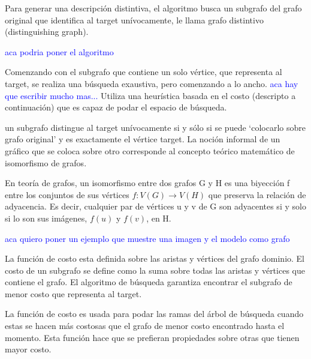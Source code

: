 
Para generar una descripci\'on distintiva, el algoritmo busca un subgrafo del grafo original que identifica al target un\'{i}vocamente, le llama grafo distintivo (distinguishing graph).

\textcolor{blue}{aca podria poner el algoritmo}

Comenzando con el subgrafo que contiene un solo v\'ertice, que representa al target, se realiza una b\'usqueda exaustiva, pero comenzando a lo ancho. \textcolor{blue}{aca hay que escribir mucho mas...} Utiliza una heur\'{i}stica basada en el costo (descripto a continuaci\'on) que es capaz de podar el espacio de b\'usqueda.


un subgrafo distingue al target un\'ivocamente si y s\'olo si se puede `colocarlo sobre grafo original' y es exactamente el
v\'ertice target. La noci\'on informal de un gr\'afico que se coloca sobre otro corresponde al concepto te\'orico matem\'atico de isomorfismo de grafos.

En teor\'{i}a de grafos, un isomorfismo entre dos grafos G y H es una biyecci\'on f entre los conjuntos de sus v\'ertices $f:V(G) \rightarrow V(H)$ que preserva la relaci\'on de adyacencia. Es decir, cualquier par de v\'ertices u y v de G son adyacentes si y solo si lo son sus im\'agenes, $f(u)$ y $f(v)$, en H.




\textcolor{blue}{aca quiero poner un ejemplo que muestre una imagen y el modelo como grafo}

La funci\'on de costo esta definida sobre las aristas y v\'ertices del grafo dominio. El costo de un subgrafo se define como la suma sobre todas las aristas y v\'ertices que contiene el grafo.
El algoritmo de b\'usqueda garantiza encontrar el subgrafo de menor costo que representa al target.

La funci\'on de costo es usada para podar las ramas del \'arbol de b\'usqueda cuando estas se hacen m\'as costosas que el grafo de menor costo encontrado hasta el momento. Esta funci\'on hace que se prefieran propiedades sobre otras que tienen mayor costo.

